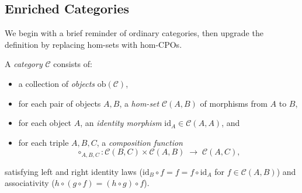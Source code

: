 \subsection{Enriched Categories}
\label{sec:bg-enriched-cats}

We begin with a brief reminder of ordinary categories, then upgrade the
definition by replacing hom-sets with hom-CPOs.

\begin{definition}[Category]
\label{def:category}
A \emph{category} $\mathcal{C}$ consists of:
\begin{itemize}
  \item a collection of \emph{objects} $\mathrm{ob}(\mathcal{C})$,
  \item for each pair of objects $A, B$, a \emph{hom-set}
        $\mathcal{C}(A, B)$ of morphisms from $A$ to $B$,
  \item for each object $A$, an \emph{identity morphism}
        $\mathrm{id}_A \in \mathcal{C}(A, A)$, and
  \item for each triple $A, B, C$, a \emph{composition function}
        \[
          \circ_{A,B,C} : \mathcal{C}(B, C) \times \mathcal{C}(A, B)
            \;\longrightarrow\; \mathcal{C}(A, C),
        \]
\end{itemize}
satisfying left and right identity laws
($\mathrm{id}_B \circ f = f = f \circ \mathrm{id}_A$ for
$f \in \mathcal{C}(A, B)$) and associativity
($h \circ (g \circ f) = (h \circ g) \circ f$).
\end{definition}


